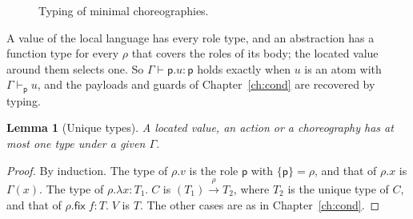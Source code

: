 \documentclass[11pt]{report}
\theoremstyle{plain}
\newtheorem{lemma}[theorem]{Lemma}
\theoremstyle{definition}
\theoremstyle{remark}
\newcommand{\kw}[1]{\mathsf{#1}}
\newcommand{\pp}{\mathsf{p}}
\newcommand{\qq}{\mathsf{q}}
\newcommand{\bind}[3]{#1 \leftarrow #2\,;\;#3}
\newcommand{\cret}[1]{\kw{ret}\;#1}
\newcommand{\com}[3]{#1.#2 \to #3}
\newcommand{\cif}[4]{\kw{if}\;#1.#2\;\kw{then}\;#3\;\kw{else}\;#4}
\newcommand{\rt}[3]{\langle #1 : #2\rangle\,#3}
\newcommand{\roles}[1]{\mathrm{roles}(#1)}
\newcommand{\loc}[1]{\mathrm{loc}(#1)}
\newcommand{\farr}[3]{(#1) \xrightarrow{#2} #3}
\newcommand{\clam}[3]{\lambda #1{:}#2.\;#3}
\newcommand{\cfix}[3]{\kw{fix}\;#1{:}#2.\;#3}
\begin{document}
\begin{figure}[t]
\caption{Typing of minimal choreographies.}
\label{fig:c5-typing}
\end{figure}

A value of the local language has every role type, and an abstraction has a
function type for every $\rho$ that covers the roles of its body; the
located value around them selects one.  So $\Gamma\vdash\pp.u:\pp$ holds
exactly when $u$ is an atom with $\Gamma\vdash_\pp u$, and the payloads and
guards of Chapter~\ref{ch:cond} are recovered by typing.

\begin{lemma}[Unique types]\label{lem:c5-unique}
  A located value, an action or a choreography has at most one type under
  a given $\Gamma$.
\end{lemma}
\begin{proof}
  By induction.  The type of $\rho.v$ is the role $\pp$ with
  $\{\pp\}=\rho$, and that of $\rho.x$ is $\Gamma(x)$.  The type of
  $\rho.\clam{x}{T_1}{C}$ is $\farr{T_1}{\rho}{T_2}$, where $T_2$ is the
  unique type of $C$, and that of $\rho.\cfix{f}{T}{V}$ is $T$.  The other
  cases are as in Chapter~\ref{ch:cond}.
\end{proof}
\end{document}
